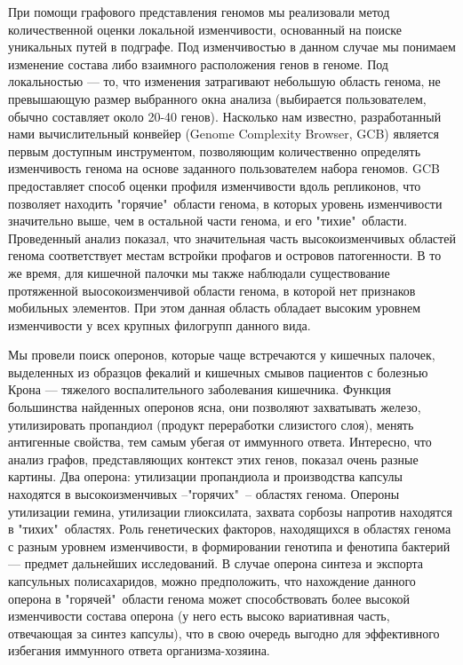 При помощи графового представления геномов мы реализовали метод количественной оценки локальной изменчивости, основанный на поиске уникальных путей в подграфе. Под изменчивостью в данном случае мы понимаем изменение состава либо взаимного расположения генов в геноме. Под локальностью --- то, что изменения затрагивают небольшую область генома, не превышающую размер выбранного окна анализа (выбирается пользователем, обычно составляет около 20-40 генов). Насколько нам известно, разработанный нами вычислительный конвейер (Genome Complexity Browser, GCB) является первым доступным инструментом, позволяющим количественно определять изменчивость генома на основе заданного пользователем набора геномов. GCB предоставляет способ оценки профиля изменчивости вдоль репликонов, что позволяет находить "горячие"\ области генома, в которых уровень изменчивости значительно выше, чем в остальной части генома, и его "тихие"\ области. Проведенный анализ показал, что значительная часть высокоизменчивых областей генома соответствует местам встройки профагов и островов патогенности. В то же время, для кишечной палочки мы также наблюдали существование протяженной выосокоизменчивой области генома, в которой нет признаков мобильных элементов. При этом данная область обладает высоким уровнем изменчивости у всех крупных филогрупп данного вида. 

Мы провели поиск оперонов, которые чаще встречаются у кишечных палочек, выделенных из образцов фекалий и кишечных смывов пациентов с болезнью Крона --- тяжелого воспалительного заболевания кишечника. Функция большинства найденных оперонов ясна, они позволяют захватывать железо, утилизировать пропандиол (продукт переработки слизистого слоя), менять антигенные свойства, тем самым убегая от иммунного ответа. Интересно, что анализ графов, представляющих контекст этих генов, показал очень разные картины. Два оперона: утилизации пропандиола и производства капсулы находятся в высокоизменчивых --"горячих"\ -- областях генома. Опероны утилизации гемина, утилизации глиоксилата, захвата сорбозы напротив находятся в "тихих"\ областях. Роль генетических факторов, находящихся в областях генома с разным уровнем изменчивости, в формировании генотипа и фенотипа бактерий --- предмет дальнейших исследований. В случае оперона синтеза и экспорта капсульных полисахаридов, можно предположить, что нахождение данного оперона в "горячей"\ области генома может способствовать более высокой изменчивости состава оперона (у него есть высоко вариативная часть, отвечающая за синтез капсулы), что в свою очередь выгодно для эффективного избегания иммунного ответа организма-хозяина.

